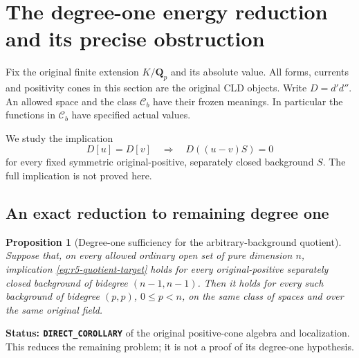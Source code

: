\documentclass[11pt,a4paper]{article}
\numberwithin{equation}{section}
\newtheorem{proposition}[theorem]{Proposition}
\theoremstyle{definition}
\theoremstyle{remark}
\begin{document}


\section{The degree-one energy reduction and its precise obstruction}
\label{sec:r5-quotient-energy}

Fix the original finite extension $K/\mathbf Q_p$ and its absolute
value. All forms, currents and positivity cones in this section are
the original CLD objects. Write $D=d'd''$. An allowed space and
the class $\mathcal C_b$ have their frozen meanings. In particular
the functions in $\mathcal C_b$ have specified actual values.

We study the implication
\begin{equation}\label{eq:r5-quotient-target}
 D[u]=D[v]\quad\Longrightarrow\quad D((u-v)S)=0
\end{equation}
for every fixed symmetric original-positive, separately closed
background $S$. The full implication is not proved here.

\subsection{An exact reduction to remaining degree one}

\begin{proposition}[Degree-one sufficiency for the arbitrary-background quotient]
\label{prop:r5-degree-one-quotient-reduction}
Suppose that, on every allowed ordinary open set of pure dimension
$n$, implication \eqref{eq:r5-quotient-target} holds for every
original-positive separately closed background of bidegree
$(n-1,n-1)$. Then it holds for every such background of bidegree
$(p,p)$, $0\leq p<n$, on the same class of spaces and over the
same original field.
\end{proposition}

\noindent\textbf{Status: \texttt{DIRECT\_COROLLARY}} of the original
positive-cone algebra and localization. This reduces the remaining
problem; it is not a proof of its degree-one hypothesis.
\end{document}
